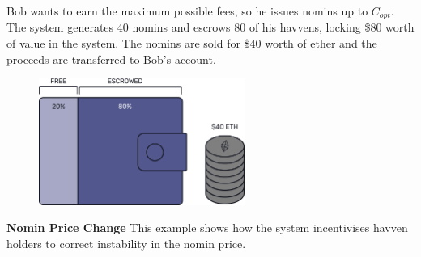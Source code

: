 \noindent Bob wants to earn the maximum possible fees, so he issues nomins up to $C_{opt}$. The system generates 40 nomins and escrows 80 of his havvens, locking \$80 worth of value in the system. The nomins are sold for \$40 worth of ether and the proceeds are transferred to Bob's account.
\begin{figure}[h!]
\centering
    \includegraphics[width=0.6\textwidth]{img/escrowed}
\end{figure}

\noindent \textbf{Nomin Price Change} This example shows how the system incentivises havven holders to correct instability in the nomin price.

